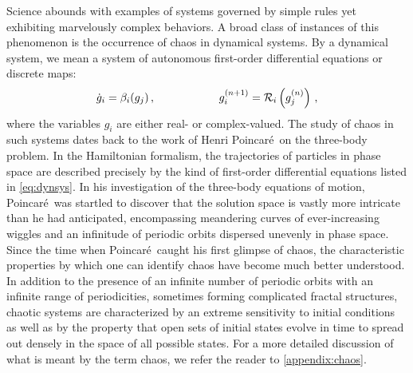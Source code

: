 Science abounds with examples of systems governed by simple rules yet exhibiting marvelously complex behaviors. A broad class of instances of this phenomenon is the occurrence of chaos in dynamical systems. By a dynamical system, we mean a system of autonomous first-order differential equations or discrete maps:
\begin{gather}
\dot{g}_i = \beta_i(g_j)\,, \hspace{20mm} g_i^{(n+1)} = \mathcal{R}_i\left(g_j^{(n)}\right)\,, \label{eq:dynsys}
\end{gather}
where the variables $g_i$ are either real- or complex-valued. The study of chaos in such systems dates back to the work of Henri Poincar\'e\ on the three-body problem. In the Hamiltonian formalism, the trajectories of particles in phase space are described precisely by the kind of first-order differential equations listed in \cref{eq:dynsys}. In his investigation of the three-body equations of motion, Poincar\'e\ was startled to discover that the solution space is vastly more intricate than he had anticipated, encompassing meandering curves of ever-increasing wiggles and an infinitude of periodic orbits dispersed unevenly in phase space. Since the time when Poincar\'e\ caught his first glimpse of chaos, the characteristic properties by which one can identify chaos have become much better understood. In addition to the presence of an infinite number of periodic orbits with an infinite range of periodicities, sometimes forming complicated fractal structures, chaotic systems are characterized by an extreme sensitivity to initial conditions as well as by the property that open sets of initial states evolve in time to spread out densely in the space of all possible states. For a more detailed discussion of what is meant by the term chaos, we refer the reader to \cref{appendix:chaos}.


